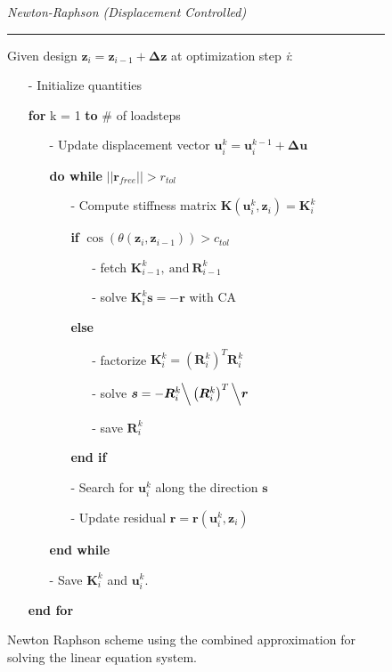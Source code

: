 \begin{minipage}[t]{0.7\textwidth}
\centering
\begin{figure}[H]
\begin{framed}
\textit{Newton-Raphson (Displacement Controlled)}
\hrule
\vspace{1ex}
Given design $\bm z_i =\bm z_{i-1} + \bm \Delta \bm z$ at optimization step \textit{i}:
\begin{itemize}
    \item[-] Initialize quantities
    \item[] \textbf{for} k = 1 \textbf{to }\# of loadsteps
    \begin{itemize}
        \item[-] Update displacement vector $\bm u_i^k = \bm u_i^{k-1} + \bm \Delta \bm u$
        \item[] \textbf{do while} $||\bm r_{free}|| > r_{tol}$
        \begin{itemize}
            \item[-] Compute stiffness matrix $\bm K(\bm u_i^k, \bm z_i) = \bm K^k_i$
            \item[] \textbf{if} $\cos(\theta(\bm z_i,\bm z_{i-1})) > c_{tol}$
            \begin{itemize}
                \item[-] fetch $\bm K^k_{i-1}, \ \text{and}\ \bm R^k_{i-1}$
                \item[-] solve $\bm K^k_i \bm s = -\bm r$ with CA
            \end{itemize}
            \item[] \textbf{else}
                \begin{itemize}
                    \item[-] factorize $\bm K^k_i = \left(\bm R^k_i\right)^T\bm R^k_i$
                    \item[-] solve $\bm s = -\bm R^k_i \Big \backslash \left(\bm R^k_i\right)^T\Big \backslash \bm r$
                    \item[-] save $\bm R^k_i$
                \end{itemize}
            \item[] \textbf{end if}
            \item[-] Search for $\bm u_i^k$ along the direction $\bm s$
            \item[-] Update residual $\bm r = \bm r(\bm u^k_i, \bm z_i)$
        \end{itemize}
        \item[] \textbf{end while}
        \item[-] Save $\bm K^k_i$ and $\bm u_i^k$.
    \end{itemize}
    \item[] \textbf{end for} 
\end{itemize}
\end{framed}
\label{}
\caption{Newton Raphson scheme using the combined approximation for solving the linear equation system.}
\end{figure}
\end{minipage}\\
